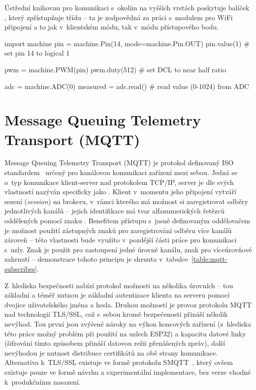 Ústřední knihovnu pro komunikaci s~okolím na vyšších vrstách poskytuje balíček , který zpřístupňuje
třídu  -- ta je zodpovědná za práci s~modulem pro WiFi připojení a to jak v~klientském módu, tak v~módu
přístupového bodu.

\begin{code}[language=Python,caption={Ukázka práce s~periferiemi čipu pomocí vestavěných knihoven jazyka MicroPython
-- v~první části se jedná o~nastavení pinu na logickou hodnotu 1, prostřední část patří nastavení pulzně šířkové
modulace (PWM) na pinu čipu a konec je ve znamení čtení z~prvního kanálu analogově-digitálního převodníku (ADC).}]
import machine
pin = machine.Pin(14, mode=machine.Pin.OUT)
pin.value(1) # set pin 14 to logical 1

pwm = machine.PWM(pin)
pwm.duty(512) # set DCL to near half ratio

adc = machine.ADC(0)
measured = adc.read() # read value (0-1024) from ADC
\end{code}

\section{Message Queuing Telemetry Transport (MQTT)}\label{sec:mqtt}
Message Queuing Telemetry Transport (MQTT) je protokol definovaný ISO standardem~\cite{ISOMQTT} určený pro
kanálovou komunikaci zařízení mezi sebou.
Jedná se o~typ komunikace klient-server nad protokolem TCP/IP, server je dle svých vlastností nazýván
specificky jako .
Klient v~momentu jeho připojení vytváří sezení (\textit{session}) na brokeru, v~rámci kterého má možnost si zaregistrovat
odběry jednotlivých kanálů -- jejich identifikace má tvar alfanumerických řetězců oddělených pomocí znaku \ic{/}.
Benefitem přístupu s~jasně definovaným oddělovačem je možnost použití zástupných znaků pro
zaregistrování odběru více kanálů zároveň -- této vlastnosti bude využito v~pozdější části práce pro komunikaci s~uzly.
Znak \ic{+} je použit pro zastoupení jedné úrovně kanálu, znak \ic{#} pro víceúrovňové zahrnutí -- demonstrace tohoto
principu je shrnuta v~tabulce~\ref{table:mqtt-subscribes}.

Z~hlediska bezpečnosti nabízí protokol možnosti na několika úrovních -- tou základní a téměř nutnou je základní
autentizace klienta na serveru pomocí dvojice uživatelského jména a hesla.
Druhou možností je provoz protokolu MQTT nad technologií TLS/SSL, což s~sebou kromě bezpečenosti přináší několik nevýhod.
Tou první jsou zvýšené nároky na výkon koncových zařízení (z~hlediska této práce možný problém při použití na
uzlech ESP32) a kapacitu datové linky (šifrování tímto způsobem přináší datovou režii přenášených zpráv), další
nevýhodou je nutnost distribuce certifikátů na obě strany komunikace.
Alternativa k~TLS/SSL existuje ve formě protokolu SMQTT~\cite{SMQTT}, který
ovšem existuje pouze ve formě návrhu a experimentální implementace, bez verze vhodné k~produkčnímu nasazení.

